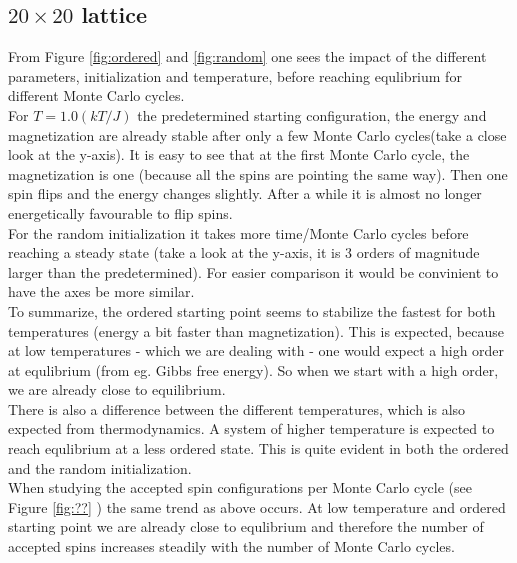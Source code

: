 \documentclass[../main.tex]{subfiles}
\begin{document}
\subsection{$20 \times 20$ lattice}
From Figure \ref{fig:ordered} and \ref{fig:random} one sees the impact of the different parameters, initialization and temperature, before reaching equlibrium for different Monte Carlo cycles. \\
For $T=1.0(kT/J)$ the predetermined starting configuration, the energy and magnetization are already stable after only a few Monte Carlo cycles(take a close look at the y-axis). It is easy to see that at the first Monte Carlo cycle, the magnetization is one (because all the spins are pointing the same way). Then one spin flips and the energy changes slightly. After a while it is almost no longer energetically favourable to flip spins. \\
For the random initialization it takes more time/Monte Carlo cycles before reaching a steady state (take a look at the y-axis, it is 3 orders of magnitude larger than the predetermined). For easier comparison it would be convinient to have the axes be more similar. \\
To summarize, the ordered starting point seems to stabilize the fastest for both temperatures (energy a bit faster than magnetization). This is expected, because at low temperatures - which we are dealing with - one would expect a high order at equlibrium (from eg. Gibbs free energy). So when we start with a high order, we are already close to equilibrium. \\
There is also a difference between the different temperatures, which is also expected from thermodynamics. A system of higher temperature is expected to reach equlibrium at a less ordered state. This is quite evident in both the ordered and the random initialization. \\
When studying the accepted spin configurations per Monte Carlo cycle (see Figure \ref{fig:??} ) the same trend as above occurs. At low temperature and ordered starting point we are already close to equlibrium and therefore the number of accepted spins increases steadily with the number of Monte Carlo cycles.

\end{document}
